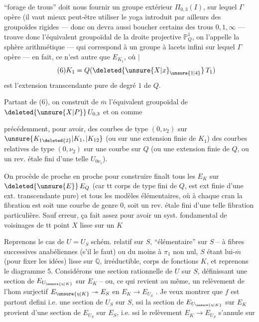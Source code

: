``forage de trous'' doit nous fournir un groupe extérieur $\Pi_{0,3}(I)$,  sur lequel $\Gamma$ opère (il vaut mieux peut-être utiliser le yoga introduit par ailleurs des groupoïdes rigides — donc on   devra aussi boucher certains des trous $0,1,\infty$ —  trouve donc l'équivalent groupoïdal de la  droite projective $\mathbb P^1_Q$, on l'appelle la sphère arithmétique — qui correspond à un groupe  à lacets infini sur lequel $\Gamma$ opère — en fait, ce n'est autre que $E_{K_1}$, où $\vert$
\[
\tag{6}K_1=Q(\deleted{\unsure{X|x}_{\unsure{1|4}}}\,T_1)
\]
est l'extension transcendante pure  de degré $1$ de $Q$.

Partant de (6), on construit de $\overline m$ l'équivalent groupoïdal de $\deleted{\unsure{X|P}}\,U_{0,3}$  et on  comme

précédemment, pour avoir,  des courbes de type $(0,\nu_2)$ sur $\unsure{K_{1\deleted{2}}|K_1,|K_{12}}$ (ou sur une extension finie de $K_1$)  des courbes relatives de type $(0,\nu_2)$ sur une courbe sur $Q$  (ou une extension finie de $Q$, ou un rev.  étale fini d'une telle $U_{0\nu_1}$).

On procède de proche en proche pour construire finalt tous les $E_K$ sur $\deleted{\unsure{E}}\,E_Q$ (car tt corps  de type fini de $Q$, est ext finie d'une ext. transcendante pure) et tous les modèles élémentaires, où à chaque cran la fibration est soit une courbe de genre $0$, soit un rev. étale fini d'une telle fibration particulière. Sauf erreur, ça fait assez pour avoir un syst. fondamental de voisinages de tt point  $X$ lisse sur un $K$

Reprenons le cas de $U=U_S$ schém. relatif sur $S$, ``élémentaire'' sur $S$ -- à fibres successives anabéliennes (s'il le faut) ou du moins à $\pi_1$ non nul, $S$ étant lui-$\overline m$ (pour fixer les idées) lisse sur $\mathbb{Q}$, irréductible, corps de fonctions $K$, et reprenons le diagramme 5. Considérons une section rationnelle  de $U$ sur $S$, définissant une section de $E_{U_{\unsure{\eta|K}}}$ sur $E_K$ -- ou, ce qui revient au même, un relèvement de l'hom surjectif $E_{\unsure{\eta|K}}\twoheadrightarrow E_S$ en $E_K\longrightarrow E_{U_S}$ . Je veux montrer que $f$ est partout defini i.e. une section  de $U_S$ sur $S$, ssi la section de $E_{U_{\unsure{\eta|K}}}$ sur $E_K$ provient d'une section de $E_{U_S}$ sur $E_S$, i.e. ssi le relèvement $E_K\longrightarrow E_{U_S}$ s'annule sur

